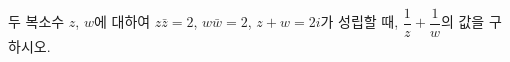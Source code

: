 두 복소수 $z$, $w$에 대하여 $z\bar{z}=2$, $w\bar{w}=2$, $z+w=2i$가 성립할 때, $\dfrac{1}{z}+\dfrac{1}{w}$의 값을 구하시오. 
